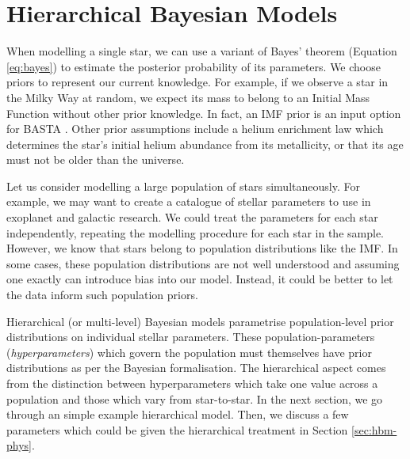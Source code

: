 %
%
%
%
%
\chapter{Hierarchical Bayesian Models}\label{chap:hbm}

When modelling a single star, we can use a variant of Bayes' theorem (Equation \ref{eq:bayes}) to estimate the posterior probability of its parameters. We choose priors to represent our current knowledge. For example, if we observe a star in the Milky Way at random, we expect its mass to belong to an Initial Mass Function \citep[IMF; e.g.][]{Chabrier2003} without other prior knowledge. In fact, an IMF prior is an input option for BASTA \citep{AguirreBorsen-Koch.Rorsted.ea2022}. Other prior assumptions include a helium enrichment law which determines the star's initial helium abundance from its metallicity, or that its age must not be older than the universe.

Let us consider modelling a large population of stars simultaneously. For example, we may want to create a catalogue of stellar parameters to use in exoplanet and galactic research. We could treat the parameters for each star independently, repeating the modelling procedure for each star in the sample. However, we know that stars belong to population distributions like the IMF. In some cases, these population distributions are not well understood and assuming one exactly can introduce bias into our model. Instead, it could be better to let the data inform such population priors.

Hierarchical (or multi-level) Bayesian models parametrise population-level prior distributions on individual stellar parameters. These population-parameters (\emph{hyperparameters}) which govern the population must themselves have prior distributions as per the Bayesian formalisation. The hierarchical aspect comes from the distinction between hyperparameters which take one value across a population and those which vary from star-to-star. In the next section, we go through an simple example hierarchical model. Then, we discuss a few parameters which could be given the hierarchical treatment in Section \ref{sec:hbm-phys}.

